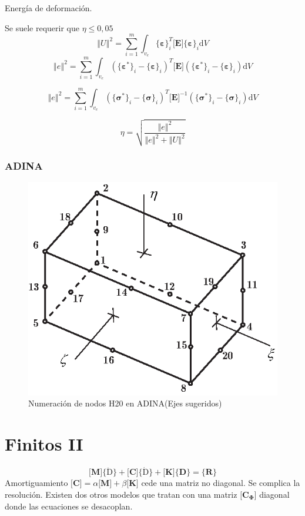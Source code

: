 \documentclass[11pt, a4paper,titlepage]{article}
\newcommand{\vvert}[1]{\left\Vert #1\right\Vert}
\newcommand{\Adina}{{\sc ADINA}}
\newcommand{\di}{\textrm{d}}
\newcommand{\sigmab}{\boldsymbol{\sigma}}
\newcommand{\varepsilonb}{\boldsymbol{\varepsilon}}
\newcommand{\Phib}{\boldsymbol{\Phi}}
\newcommand{\Mme}[1]{\boldsymbol{[}\mathbf{#1} \boldsymbol{]}}
\newcommand{\Cme}[1]{\boldsymbol{\{ }\mathbf{#1} \boldsymbol{\}} }
\newcommand{\ME}{\Mme{E}}
\newcommand{\modal}{{_{\Phib}}}
\newcommand{\feaTP}{null.tex}
\begin{document}
Energía de deformación.

Se suele requerir que $\eta\leq 0,05$
\[
\vvert{U}^2 = \sum^m_{i=1}\int_{v_e} \Cme{\varepsilonb}_i^T \ME \Cme{\varepsilonb}_i \di V
\]
\[
\vvert{e}^2=\sum_{i=1}^m \int_{v_e} \left( \Cme{\varepsilonb^*}_i - \Cme{\varepsilonb}_i\right)^T \ME \left( \Cme{\varepsilonb^*}_i - \Cme{\varepsilonb}_i\right) \di V
\]

\[
\vvert{e}^2=\sum_{i=1}^m \int_{v_e} \left( \Cme{\sigmab^*}_i - \Cme{\sigmab}_i\right)^T \ME ^{-1} \left( \Cme{\sigmab^*}_i - \Cme{\sigmab}_i\right) \di V
\]

\[
\eta = \sqrt{\frac{\vvert{e}^2}{\vvert{e}^2+\vvert{U}^2}}
\]





\subsubsection*{\Adina}
\begin{figure}[htb!]
    \centering
    \includegraphics[width=.6\textwidth]{fig/H20numbering.eps}
    \caption{Numeración de nodos H20 en \Adina (Ejes sugeridos)}
    \label{fig:H20numbering}
\end{figure}

\section{Finitos II}
\begin{equation} \label{eq:vibraciones}
	\Mme{M}\Cme{\boldsymbol{\ddot{\mathrm{D}}}} + \Mme{C}\Cme{\boldsymbol{\dot{\mathrm{D}}}}+\Mme{K} \Cme{D} =\Cme{R}
\end{equation}
Amortiguamiento $\Mme{C} = \alpha \Mme{M}+\beta \Mme{K}$ cede una matriz no diagonal. Se complica la resolución. Existen dos otros modelos que tratan con una matriz $\Mme{C\modal}$ diagonal donde las ecuaciones se desacoplan.
\end{document}
